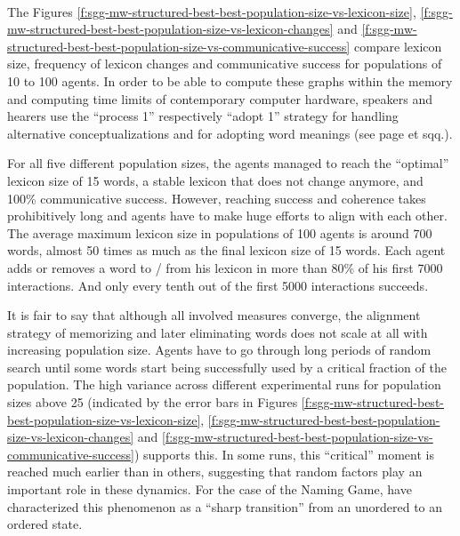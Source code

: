 \stopfiguregroup

~\\

The Figures
\ref{f:sgg-mw-structured-best-best-population-size-vs-lexicon-size},
\ref{f:sgg-mw-structured-best-best-population-size-vs-lexicon-changes}
and
\ref{f:sgg-mw-structured-best-best-population-size-vs-communicative-success}
compare lexicon size, frequency of lexicon changes and communicative
success for populations of 10 to 100 agents. In order to be able to
compute these graphs within the memory and computing time limits of
contemporary computer hardware, speakers and hearers use the ``process
1'' respectively ``adopt 1'' strategy for handling alternative
conceptualizations and for adopting word meanings (see page
\pageref{f:sgg-sw-unstructured-50-attrs-conceptualization-handling-vs-lexicon-changes}
et sqq.).

For all five different population sizes, the agents managed to reach
the ``optimal'' lexicon size of 15 words, a stable lexicon that does
not change anymore, and 100\% communicative success. However, reaching
success and coherence takes prohibitively long and agents have to make
huge efforts to align with each other. The average maximum lexicon
size in populations of 100 agents is around 700 words, almost 50 times
as much as the final lexicon size of 15 words. Each agent adds or
removes a word to / from his lexicon in more than 80\% of his first
7000 interactions. And only every tenth out of the first 5000
interactions succeeds. 

It is fair to say that although all involved measures converge, the
alignment strategy of memorizing and later eliminating words does not
scale at all with increasing population size. Agents have to go
through long periods of random search until some words start being
successfully used by a critical fraction of the population. The high
variance across different experimental runs for population sizes above
25 (indicated by the error bars in Figures
\ref{f:sgg-mw-structured-best-best-population-size-vs-lexicon-size},
\ref{f:sgg-mw-structured-best-best-population-size-vs-lexicon-changes}
and
\ref{f:sgg-mw-structured-best-best-population-size-vs-communicative-success})
supports this. In some runs, this ``critical'' moment is reached much
earlier than in others, suggesting that random factors play an
important role in these dynamics. For the case of the Naming Game,
\cite{baronchelli06sharp} have characterized this phenomenon as a
``sharp transition'' from an unordered to an ordered state.

